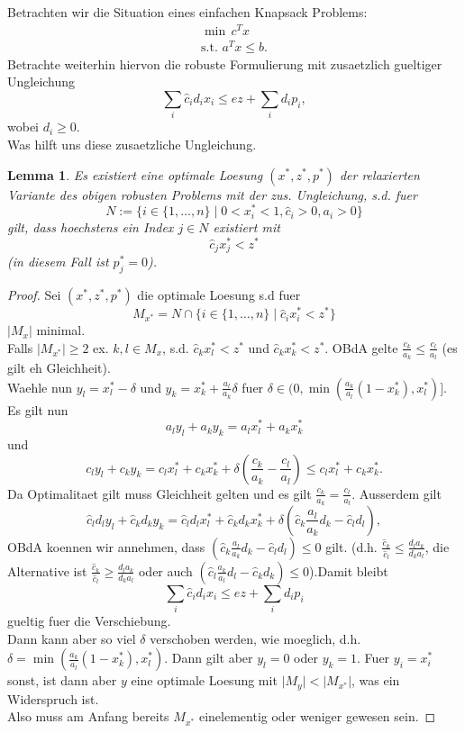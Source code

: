 \documentclass[titlepage, a4paper]{amsbook}
\theoremstyle{plain}
\newtheorem{lem}[thm]{Lemma}
\theoremstyle{break}
\theoremstyle{definition}
\theoremstyle{remark}
\numberwithin{equation}{thm}
\begin{document}
Betrachten wir die Situation eines einfachen Knapsack Problems:
\begin{align*}
    \min\,c^Tx \\
    \text{s.t. }a^Tx \leq b.
\end{align*}
Betrachte weiterhin hiervon die robuste Formulierung mit zusaetzlich gueltiger Ungleichung
\[\sum_i \hat{c}_i d_i x_i \leq ez + \sum_i d_i p_i,\]
wobei $d_i \geq 0$. \\ Was hilft uns diese zusaetzliche Ungleichung.
\begin{lem}
Es existiert eine optimale Loesung $(x^*,z^*,p^*)$ der relaxierten Variante des obigen robusten Problems mit der zus. Ungleichung, s.d. fuer \[N:=\{i \in \{1, \ldots, n\} \mid 0< x^*_i <1, \hat{c}_i > 0 , a_i >0 \}\] gilt, dass hoechstens ein Index $j \in N$ existiert mit 
\[\hat{c}_j x^*_j < z^* \]
(in diesem Fall ist $p^*_j=0$).
\end{lem}
\begin{proof}
Sei $(x^*,z^*,p^*)$ die optimale Loesung s.d fuer
\[M_{x^*}=N \cap \{i \in \{1, \ldots, n\} \mid \hat{c}_ix^*_i < z^*\}\]
$\vert M_{x} \vert$ minimal. \\
Falls $\vert M_{x^*} \vert \geq 2$ ex. $k,l \in M_x$, s.d. $\hat{c}_kx^*_l < z^*$ und $\hat{c}_kx^*_k < z^*$. OBdA gelte $\frac{c_k}{a_k} \leq \frac{c_l}{a_l}$ (es gilt eh Gleichheit).\\
Waehle nun $y_l=x^*_l-\delta$ und $y_k=x^*_k+\frac{a_l}{a_k}\delta$
fuer $\delta \in (0, \min(\frac{a_k}{a_l}(1-x^*_k), x^*_l)]$. \\
Es gilt nun 
\[a_l y_l + a_k y_k = a_l x^*_l + a_k x^*_k\]
und 
\[c_l y_l + c_k y_k = c_l x^*_l + c_k x^*_k + \delta (\frac{c_k}{a_k} - \frac{c_l}{a_l}) \leq c_l x^*_l + c_k x^*_k .\]
Da Optimalitaet gilt muss Gleichheit gelten und es gilt $\frac{c_k}{a_k} = \frac{c_l}{a_l}$. 
Ausserdem gilt 
\[\hat{c}_ld_ly_l+\hat{c}_kd_ky_k = \hat{c}_ld_lx^*_l+\hat{c}_kd_kx^*_k + \delta (\hat{c}_k\frac{a_l}{a_k}d_k - \hat{c}_ld_l),\]
OBdA koennen wir annehmen, dass $(\hat{c}_k\frac{a_l}{a_k}d_k - \hat{c}_ld_l) \leq 0$ gilt. (d.h. $\frac{\hat{c}_k}{\hat{c}_l}\leq \frac{d_la_k}{d_ka_l}$, die Alternative ist $\frac{\hat{c}_k}{\hat{c}_l}\geq\frac{d_la_k}{d_ka_l}$ oder auch $(\hat{c}_l\frac{a_k}{a_l}d_l - \hat{c}_kd_k) \leq 0$).Damit bleibt \[\sum_i \hat{c}_i d_i x_i \leq ez + \sum_i d_i p_i\] gueltig fuer die Verschiebung. \\
Dann kann aber so viel $\delta$ verschoben werden, wie moeglich, d.h.
$\delta = \min(\frac{a_k}{a_l}(1-x^*_k), x^*_l)$. Dann gilt aber $y_l=0$ oder $y_k=1$. Fuer $y_i=x^*_i$ sonst, ist dann aber $y$ eine optimale Loesung mit $\vert M_y \vert < \vert M_{x^*} \vert$, was ein Widerspruch ist. \\
Also muss am Anfang bereits $M_{x^*}$ einelementig oder weniger gewesen sein.
\end{proof}
\end{document}
